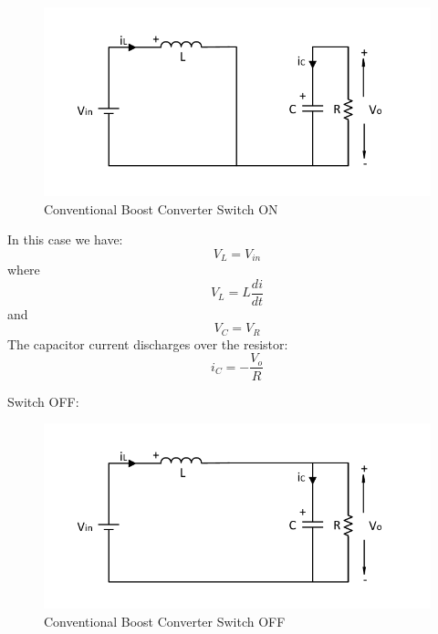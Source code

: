 \begin{figure}[H]
   \centering
   \includegraphics[width=\textwidth]{figures/aConventionalBoost/ConventionalBoostConverterON.pdf}
    \caption{Conventional Boost Converter Switch ON}
	\label{fig:ConventionalBoostONN}
\end{figure}

In this case we have:
\begin{equation}
	V_L = V_{in}
	\label{eq:pumpHeadModel}
\end{equation}
where
\begin{equation}
	V_L = L \frac{di}{dt}
	\label{eq:pumpHeadModel}
\end{equation}
and
\begin{equation}
	V_C = V_R
	\label{eq:pumpHeadMode2}
\end{equation}
The capacitor current discharges over the resistor:
\begin{equation}
	i_C = -\frac{V_o}{R}
	\label{eq:pumpHeadMode3}
\end{equation}


Switch OFF:

\begin{figure}[H]
   \centering
   \includegraphics[width=\textwidth]{figures/aConventionalBoost/ConventionalBoostConverterOFF.pdf}
    \caption{Conventional Boost Converter Switch OFF}
	\label{fig:ConventionalBoostOFF}
\end{figure}

